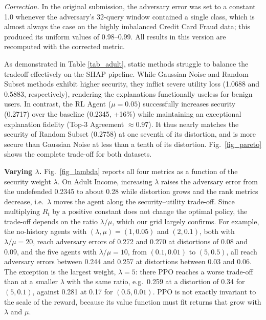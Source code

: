 \documentclass[conference]{IEEEtran}
\DeclareRobustCommand{\rev}[1]{#1}
\DeclareRobustCommand{\revnew}[1]{#1}
\begin{document}
\rev{\textit{Correction.} In the original submission, the adversary error was set to a constant 1.0 whenever the adversary's 32-query window contained a single class, which is almost always the case on the highly imbalanced Credit Card Fraud data; this produced its uniform values of 0.98--0.99. All results in this version are recomputed with the corrected metric.}

As demonstrated in Table \ref{tab_adult}, static methods struggle to balance the tradeoff effectively on the SHAP pipeline. While Gaussian Noise and Random Subset methods exhibit higher security, they inflict severe utility loss (\rev{1.0688 and 0.5883}, respectively), rendering the explanations functionally useless for benign users. In contrast, the RL Agent ($\mu=0.05$) successfully increases security (\rev{0.2717}) over the baseline (\rev{0.2345}, \rev{+16\%}) while maintaining an exceptional explanation fidelity (Top-3 Agreement $\approx 0.97$). \rev{It thus nearly matches the security of Random Subset (0.2758) at one seventh of its distortion, and is more secure than Gaussian Noise at less than a tenth of its distortion. Fig.~\ref{fig_pareto} shows the complete trade-off for both datasets.}

\rev{\textbf{Varying $\lambda$.} Fig.~\ref{fig_lambda} reports all four metrics as a function of the security weight $\lambda$. On Adult Income, increasing $\lambda$ raises the adversary error from the undefended 0.2345 to about 0.28 while distortion grows and the rank metrics decrease, i.e.\ $\lambda$ moves the agent along the security--utility trade-off. Since multiplying $R_t$ by a positive constant does not change the optimal policy, the trade-off depends on the ratio $\lambda/\mu$, which our grid \revnew{largely confirms. For example, the no-history agents with $(\lambda,\mu) = (1, 0.05)$ and $(2, 0.1)$, both with $\lambda/\mu=20$, reach adversary errors of 0.272 and 0.270 at distortions of 0.08 and 0.09, and the five agents with $\lambda/\mu=10$, from $(0.1, 0.01)$ to $(5, 0.5)$, all reach adversary errors between 0.244 and 0.257 at distortions between 0.03 and 0.06. The exception is the largest weight, $\lambda=5$: there PPO reaches a worse trade-off than at a smaller $\lambda$ with the same ratio, e.g.\ 0.259 at a distortion of 0.34 for $(5, 0.1)$, against 0.281 at 0.17 for $(0.5, 0.01)$. PPO is not exactly invariant to the scale of the reward, because its value function must fit returns that grow with $\lambda$ and $\mu$.}}
\end{document}
